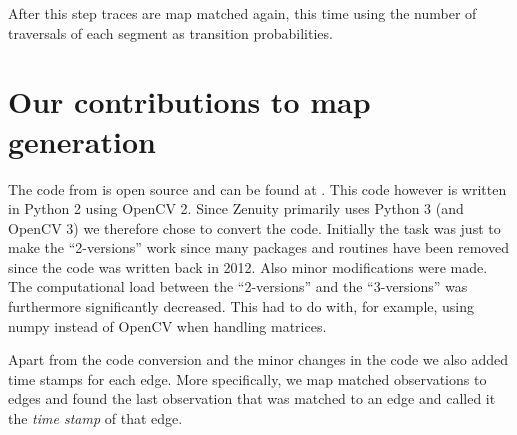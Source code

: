 After this step traces are map matched again, this time using the number of traversals of each segment as transition probabilities.







\section{Our contributions to map generation}
\label{chp:method.sec:contr_mapgen}

The code from \cite{biagioni:gis12} is open source and can be found at \citep{chicago}. This code however is written in Python 2 using OpenCV 2. Since Zenuity primarily uses Python 3 (and OpenCV 3) we therefore chose to convert the code. Initially the task was just to make the ``2-versions'' work since many packages and routines have been removed since the code was written back in 2012. Also minor modifications were made. The computational load between the ``2-versions'' and the ``3-versions'' was furthermore significantly decreased. This had to do with, for example, using numpy instead of OpenCV when handling matrices. 

Apart from the code conversion and the minor changes in the code we also added time stamps for each edge. More specifically, we map matched observations to edges and found the last observation that was matched to an edge and called it the \textit{time stamp} of that edge.



